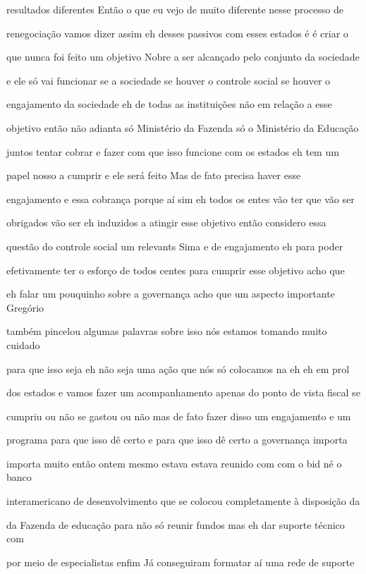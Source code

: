 \documentclass[a4paper,12pt]{article}
\begin{document}
resultados diferentes Então o que eu vejo de muito diferente nesse processo de

renegociação vamos dizer assim eh desses passivos com esses estados é é criar o

que nunca foi feito um objetivo Nobre a ser alcançado pelo conjunto da sociedade

e ele só vai funcionar se a sociedade se houver o controle social se houver o

engajamento da sociedade eh de todas as instituições não em relação a esse

objetivo então não adianta só Ministério da Fazenda só o Ministério da Educação

juntos tentar cobrar e fazer com que isso funcione com os estados eh tem um

papel nosso a cumprir e ele será feito Mas de fato precisa haver esse

engajamento e essa cobrança porque aí sim eh todos os entes vão ter que vão ser

obrigados vão ser eh induzidos a atingir esse objetivo então considero essa

questão do controle social um relevants Sima e de engajamento eh para poder

efetivamente ter o esforço de todos centes para cumprir esse objetivo acho que

eh falar um pouquinho sobre a governança acho que um aspecto importante Gregório

também pincelou algumas palavras sobre isso nós estamos tomando muito cuidado

para que isso seja eh não seja uma ação que nós só colocamos na eh eh em prol

dos estados e vamos fazer um acompanhamento apenas do ponto de vista fiscal se

cumpriu ou não se gastou ou não mas de fato fazer disso um engajamento e um

programa para que isso dê certo e para que isso dê certo a governança importa

importa muito então ontem mesmo estava estava reunido com com o bid né o banco

interamericano de desenvolvimento que se colocou completamente à disposição da

da Fazenda de educação para não só reunir fundos mas eh dar suporte técnico com

por meio de especialistas enfim Já conseguiram formatar aí uma rede de suporte
\end{document}

